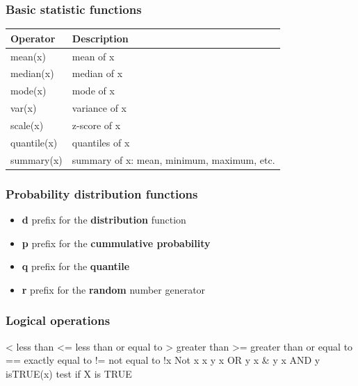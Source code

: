 \documentclass[]{article}
\begin{document}
\hypertarget{basic-statistic-functions}{%
\subsubsection{Basic statistic
functions}\label{basic-statistic-functions}}

\begin{longtable}[]{@{}ll@{}}
\toprule
Operator & Description\tabularnewline
\midrule
\endhead
mean(x) & mean of x\tabularnewline
median(x) & median of x\tabularnewline
mode(x) & mode of x\tabularnewline
var(x) & variance of x\tabularnewline
scale(x) & z-score of x\tabularnewline
quantile(x) & quantiles of x\tabularnewline
summary(x) & summary of x: mean, minimum, maximum, etc.\tabularnewline
\bottomrule
\end{longtable}

\hypertarget{probability-distribution-functions}{%
\subsubsection{Probability distribution
functions}\label{probability-distribution-functions}}

\begin{itemize}
\item
  \textbf{d} prefix for the \textbf{distribution} function
\item
  \textbf{p} prefix for the \textbf{cummulative probability}
\item
  \textbf{q} prefix for the \textbf{quantile}
\item
  \textbf{r} prefix for the \textbf{random} number generator
\end{itemize}

\hypertarget{logical-operations}{%
\subsubsection{Logical operations}\label{logical-operations}}

\textbar{}\textless{} \textbar{}less than\textbar{}
\textbar{}\textless{}= \textbar{}less than or equal to\textbar{}
\textbar{}\textgreater{} \textbar{}greater than\textbar{}
\textbar{}\textgreater{}= \textbar{}greater than or equal to\textbar{}
\textbar{}== \textbar{}exactly equal to\textbar{} \textbar{}!=
\textbar{}not equal to \textbar{} \textbar{}!x \textbar{}Not x\textbar{}
\textbar{}x \textbar{} y \textbar{} x OR y\textbar{} \textbar{}x \& y
\textbar{} x AND y\textbar{} \textbar{}isTRUE(x) \textbar{}test if X is
TRUE\textbar{}
\end{document}
